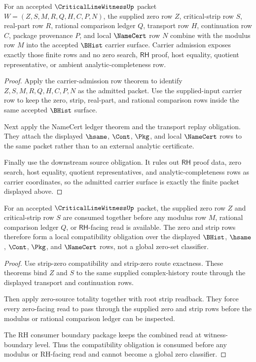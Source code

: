 \begin{theorem}
\label{thm:critical-line-witness-carrier-admission-obligation}
For an accepted $\CriticalLineWitnessUp$ packet $W=(Z,S,M,R,Q,H,C,P,N)$, the supplied zero row $Z$, critical-strip row $S$, real-part row $R$, rational comparison ledger $Q$, transport row $H$, continuation row $C$, package provenance $P$, and local $\NameCert$ row $N$ combine with the modulus row $M$ into the accepted $\BHist$ carrier surface. Carrier admission exposes exactly those finite rows and no zero search, $\mathsf{RH}$ proof, host equality, quotient representative, or ambient analytic-completeness row.
\end{theorem}
\begin{proof}
Apply the carrier-admission row theorem to identify $Z,S,M,R,Q,H,C,P,N$ as the admitted packet. Use the supplied-input carrier row to keep the zero, strip, real-part, and rational comparison rows inside the same accepted $\BHist$ surface.

Next apply the NameCert ledger theorem and the transport replay obligation. They attach the displayed $\hsame$, $\Cont$, $\Pkg$, and local $\NameCert$ rows to the same packet rather than to an external analytic certificate.

Finally use the downstream source obligation. It rules out $\mathsf{RH}$ proof data, zero search, host equality, quotient representatives, and analytic-completeness rows as carrier coordinates, so the admitted carrier surface is exactly the finite packet displayed above.
\end{proof}

\begin{theorem}
\label{thm:critical-line-witness-zero-strip-compatibility-obligation}
For an accepted $\CriticalLineWitnessUp$ packet, the supplied zero row $Z$ and critical-strip row $S$ are consumed together before any modulus row $M$, rational comparison ledger $Q$, or $\mathsf{RH}$-facing read is available. The zero and strip rows therefore form a local compatibility obligation over the displayed $\BHist$, $\hsame$, $\Cont$, $\Pkg$, and $\NameCert$ rows, not a global zero-set classifier.
\end{theorem}
\begin{proof}
Use strip-zero compatibility and strip-zero route exactness. These theorems bind $Z$ and $S$ to the same supplied complex-history route through the displayed transport and continuation rows.

Then apply zero-source totality together with root strip readback. They force every zero-facing read to pass through the supplied zero and strip rows before the modulus or rational comparison ledger can be inspected.

The RH consumer boundary package keeps the combined read at witness-boundary level. Thus the compatibility obligation is consumed before any modulus or RH-facing read and cannot become a global zero classifier.
\end{proof}
